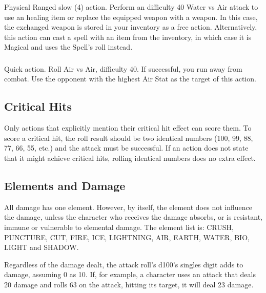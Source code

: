 \begin{multicols}{2}
\subsubsection{}
Physical Ranged slow (4) action. Perform an difficulty 40 Water vs Air attack to use an healing item or replace the equipped weapon with a weapon. In this case, the exchanged weapon is stored in your inventory as a free action. Alternatively, this action can cast a spell with an item from the inventory, in which case it is Magical and uses the Spell's roll instead.     

\subsubsection{}
Quick action. Roll Air vs Air, difficulty 40. If successful, you run away from combat. Use the opponent with the highest Air Stat as the target of this action.

\subsection{Critical Hits}
Only actions that explicitly mention their critical hit effect can score them. To score a critical hit, the roll result should be two identical numbers (100, 99, 88, 77, 66, 55, etc.) and the attack must be successful. If an action does not state that it might achieve critical hits, rolling identical numbers does no extra effect.

\begin{center}
\end{center}

\subsection{Elements and Damage}
All damage has one element. However, by itself, the element does not influence the damage, unless the character who receives the damage absorbs, or is resistant, immune or vulnerable to elemental damage. The element list is: CRUSH, PUNCTURE, CUT, FIRE, ICE, LIGHTNING, AIR, EARTH, WATER, BIO, LIGHT and SHADOW\@. %

Regardless of the damage dealt, the attack roll’s d100’s singles digit adds to damage, assuming 0 as 10. If, for example, a character uses an attack that deals 20 damage and rolls 63 on the attack, hitting its target, it will deal 23 damage.


\end{multicols}
